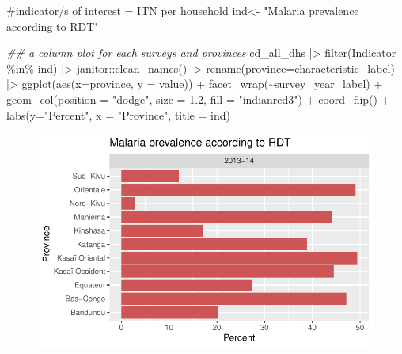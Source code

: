 \documentclass[
  letterpaper,
  DIV=11,
  numbers=noendperiod]{scrreprt}
\newenvironment{Shaded}{\begin{snugshade}}{\end{snugshade}}
\newcommand{\AttributeTok}[1]{\textcolor[rgb]{0.40,0.45,0.13}{#1}}
\newcommand{\CommentTok}[1]{\textcolor[rgb]{0.37,0.37,0.37}{#1}}
\newcommand{\DocumentationTok}[1]{\textcolor[rgb]{0.37,0.37,0.37}{\textit{#1}}}
\newcommand{\FloatTok}[1]{\textcolor[rgb]{0.68,0.00,0.00}{#1}}
\newcommand{\FunctionTok}[1]{\textcolor[rgb]{0.28,0.35,0.67}{#1}}
\newcommand{\NormalTok}[1]{\textcolor[rgb]{0.00,0.23,0.31}{#1}}
\newcommand{\OtherTok}[1]{\textcolor[rgb]{0.00,0.23,0.31}{#1}}
\newcommand{\SpecialCharTok}[1]{\textcolor[rgb]{0.37,0.37,0.37}{#1}}
\newcommand{\StringTok}[1]{\textcolor[rgb]{0.13,0.47,0.30}{#1}}
\begin{document}
\begin{Shaded}
\begin{Highlighting}[]
\CommentTok{\#indicator/s of interest = ITN per household}
\NormalTok{ind}\OtherTok{\textless{}{-}} \StringTok{"Malaria prevalence according to RDT"}   

\DocumentationTok{\#\# a column plot for each surveys and provinces }
\NormalTok{cd\_all\_dhs }\SpecialCharTok{|\textgreater{}}
  \FunctionTok{filter}\NormalTok{(Indicator }\SpecialCharTok{\%in\%}\NormalTok{ ind) }\SpecialCharTok{|\textgreater{}}
\NormalTok{    janitor}\SpecialCharTok{::}\FunctionTok{clean\_names}\NormalTok{() }\SpecialCharTok{|\textgreater{}}  
  \FunctionTok{rename}\NormalTok{(}\AttributeTok{province=}\NormalTok{characteristic\_label) }\SpecialCharTok{|\textgreater{}}
  \FunctionTok{ggplot}\NormalTok{(}\FunctionTok{aes}\NormalTok{(}\AttributeTok{x=}\NormalTok{province, }\AttributeTok{y =}\NormalTok{ value)) }\SpecialCharTok{+}
  \FunctionTok{facet\_wrap}\NormalTok{(}\SpecialCharTok{\textasciitilde{}}\NormalTok{survey\_year\_label) }\SpecialCharTok{+}
  \FunctionTok{geom\_col}\NormalTok{(}\AttributeTok{position =} \StringTok{"dodge"}\NormalTok{, }\AttributeTok{size =} \FloatTok{1.2}\NormalTok{, }\AttributeTok{fill =} \StringTok{"indianred3"}\NormalTok{) }\SpecialCharTok{+}
  \FunctionTok{coord\_flip}\NormalTok{() }\SpecialCharTok{+}
  \FunctionTok{labs}\NormalTok{(}\AttributeTok{y=}\StringTok{"Percent"}\NormalTok{, }\AttributeTok{x =} \StringTok{"Province"}\NormalTok{,}
       \AttributeTok{title =}\NormalTok{ ind)}
\end{Highlighting}
\end{Shaded}

\begin{figure}[H]

{\centering \includegraphics{module_02_files/figure-pdf/unnamed-chunk-12-1.pdf}

}

\end{figure}
\end{document}
